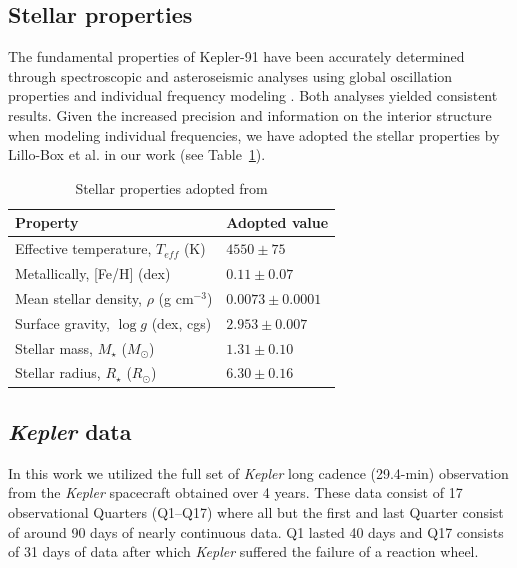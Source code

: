 \documentclass[apjl]{emulateapj}
\begin{document}
\subsection{Stellar properties}


The fundamental properties of Kepler-91 have been accurately determined through spectroscopic and asteroseismic analyses using global oscillation properties \citep{huber13} and individual frequency modeling \citep{lillo14} . Both analyses yielded consistent results. Given the increased precision and information on the interior structure when modeling individual frequencies, we have adopted the stellar properties by Lillo-Box et al. in our work (see Table~\ref{tab:stellar}).

\begin{table}
\centering
\caption{Stellar properties adopted from \citet{lillo14}}\label{tab:stellar}
\begin{tabular}{l l }
Property & Adopted value \\
\hline
Effective temperature, $T_{eff}$ (K)		&	$4550\pm75$ \\
Metallically, [Fe/H] (dex)				& 	$0.11 \pm0.07$\\
Mean stellar density, $\rho$ (g cm$^{-3}$)		&	$0.0073 \pm0.0001$ \\
Surface gravity, $\log{g}$ (dex, cgs)		&	$2.953 \pm 0.007$ \\
Stellar mass, $M_\star$ ($M_\odot$)		&	$1.31 \pm 0.10$\\
Stellar radius, $R_\star$ ($R_\odot$)		&	$6.30 \pm 0.16$ \\
\hline
\end{tabular}
\end{table}


\subsection{\emph{Kepler} data}
In this work we utilized the full set of \emph{Kepler} long cadence (29.4-min) observation from the \emph{Kepler} spacecraft obtained over 4 years. These data consist of 17 observational Quarters  (Q1--Q17) where all but the first and last Quarter consist of around 90 days of nearly continuous data. Q1 lasted 40 days and Q17 consists of 31 days of data after which \emph{Kepler} suffered the failure of a reaction wheel.
\end{document}
